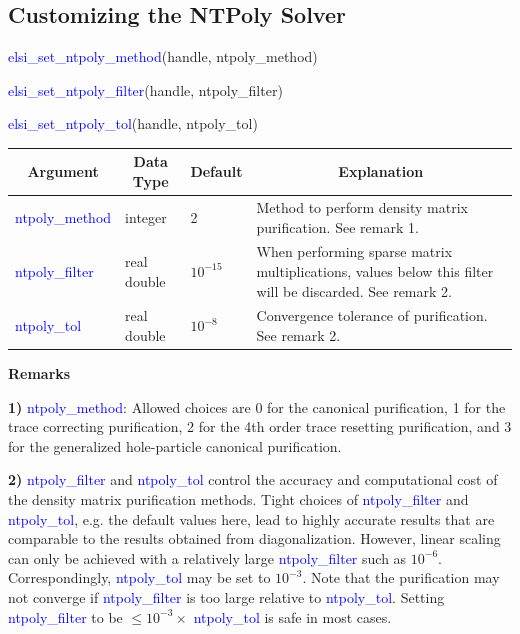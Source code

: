 \documentclass{report}
\begin{document}
\subsection{Customizing the NTPoly Solver}
\label{subsec:setter_ntpoly}
\begin{labeling}{\hspace{6cm}}
\item [\hspace{0.3cm} \textcolor{blue}{elsi\_set\_ntpoly\_method}(handle, ntpoly\_method)]
\item [\hspace{0.3cm} \textcolor{blue}{elsi\_set\_ntpoly\_filter}(handle, ntpoly\_filter)]
\item [\hspace{0.3cm} \textcolor{blue}{elsi\_set\_ntpoly\_tol}(handle, ntpoly\_tol)]
\end{labeling}

\begin{tabular}[]{|p{30mm}|p{20mm}|p{15mm}|p{100mm}|}
\hline
\multicolumn{1}{|c|}{\textbf{Argument}} & \multicolumn{1}{c|}{\textbf{Data Type}} & \multicolumn{1}{c|}{\textbf{Default}} & \multicolumn{1}{c|}{\textbf{Explanation}}\\
\hline
\textcolor{blue}{ntpoly\_method} & integer     & 2          & Method to perform density matrix purification.  See remark 1.\\
\hline
\textcolor{blue}{ntpoly\_filter} & real double & $10^{-15}$ & When performing sparse matrix multiplications, values below this filter will be discarded.  See remark 2.\\
\hline
\textcolor{blue}{ntpoly\_tol}    & real double & $10^{-8}$  & Convergence tolerance of purification.  See remark 2.\\
\hline
\end{tabular}

\textbf{Remarks}

\textbf{1)} \textcolor{blue}{ntpoly\_method}:  Allowed choices are 0 for the canonical purification, 1 for the trace correcting purification, 2 for the 4th order trace resetting purification, and 3 for the generalized hole-particle canonical purification.

\textbf{2)} \textcolor{blue}{ntpoly\_filter} and \textcolor{blue}{ntpoly\_tol} control the accuracy and computational cost of the density matrix purification methods.  Tight choices of \textcolor{blue}{ntpoly\_filter} and \textcolor{blue}{ntpoly\_tol}, e.g. the default values here, lead to highly accurate results that are comparable to the results obtained from diagonalization.  However, linear scaling can only be achieved with a relatively large \textcolor{blue}{ntpoly\_filter} such as $10^{-6}$.  Correspondingly, \textcolor{blue}{ntpoly\_tol} may be set to $10^{-3}$.  Note that the purification may not converge if \textcolor{blue}{ntpoly\_filter} is too large relative to \textcolor{blue}{ntpoly\_tol}.  Setting \textcolor{blue}{ntpoly\_filter} to be $\le 10^{-3} \times $ \textcolor{blue}{ntpoly\_tol} is safe in most cases.
\end{document}
